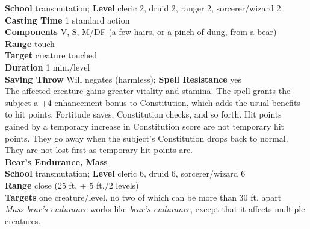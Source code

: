 \textbf{School} transmutation; \textbf{Level} cleric 2, druid 2, ranger 2, sorcerer/wizard 2\\
\textbf{Casting Time} 1 standard action\\
\textbf{Components} V, S, M/DF (a few hairs, or a pinch of dung, from a bear)\\
\textbf{Range} touch\\
\textbf{Target} creature touched\\
\textbf{Duration} 1 min./level\\
\textbf{Saving Throw }Will negates (harmless); \textbf{Spell Resistance} yes\\
The affected creature gains greater vitality and stamina. The spell grants the subject a +4 enhancement bonus to Constitution, which adds the usual benefits to hit points, Fortitude saves, Constitution checks, and so forth. Hit points gained by a temporary increase in Constitution score are not temporary hit points. They go away when the subject's Constitution drops back to normal. They are not lost first as temporary hit points are.\\
\textbf{Bear's Endurance, Mass}\\
\textbf{School} transmutation; \textbf{Level} cleric 6, druid 6, sorcerer/wizard 6\\
\textbf{Range} close (25 ft. + 5 ft./2 levels)\\
\textbf{Targets} one creature/level, no two of which can be more than 30 ft. apart\\
\textit{Mass bear's endurance }works like \textit{bear's endurance}, except that it affects multiple creatures.\\
